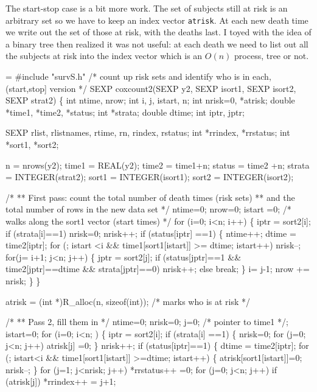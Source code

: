 \documentclass{article}
\begin{document}
The start-stop case is a bit more work.
The set of subjects still at risk is an arbitrary set so we have to 
keep an index vector \Verb!atrisk!.
At each new death time we write out the set of those at risk, with the
deaths last.
I toyed with the idea of a binary tree then realized it was not useful:
at each death we need to list out all the subjects at risk into the index
vector which is an $O(n)$ process, tree or not.
\begin{nwchunk}
=
 #include "survS.h"
 /* count up risk sets and identify who is in each, (start,stop] version */
 SEXP coxcount2(SEXP y2, SEXP isort1, SEXP isort2, SEXP strat2) \{
     int ntime, nrow;
     int i, j, istart, n;
     int nrisk=0, *atrisk;
     double *time1, *time2, *status;
     int *strata;
     double dtime;
     int iptr, jptr;
 
     SEXP rlist, rlistnames, rtime, rn, rindex, rstatus;
     int *rrindex, *rrstatus;
     int *sort1, *sort2;
     
     n = nrows(y2);
     time1 = REAL(y2);
     time2 =  time1+n;
     status = time2 +n;
     strata = INTEGER(strat2);
     sort1 = INTEGER(isort1);
     sort2 = INTEGER(isort2);
     
     /* 
     ** First pass: count the total number of death times (risk sets)
     **  and the total number of rows in the new data set
     */
     ntime=0; nrow=0;
     istart =0;  /* walks along the sort1 vector (start times) */
         for (i=0; i<n; i++) \{
         iptr = sort2[i];
         if (strata[i]==1) nrisk=0;
         nrisk++;
         if (status[iptr] ==1) \{
             ntime++;
             dtime = time2[iptr];
             for (; istart <i && time1[sort1[istart]] >= dtime; istart++) 
                          nrisk--;
             for(j= i+1; j<n; j++) \{
                 jptr = sort2[j];
                 if (status[jptr]==1 && time2[jptr]==dtime && strata[jptr]==0)
                     nrisk++;
                 else break;
                 \}
             i= j-1;
             nrow += nrisk;
             \}
         \}
 
     atrisk = (int *)R_alloc(n, sizeof(int)); /* marks who is at risk */
     
     /*
     ** Pass 2, fill them in
     */
     ntime=0; nrisk=0;
     j=0;  /* pointer to time1 */;
     istart=0;
     for (i=0; i<n; ) \{
         iptr = sort2[i];
         if (strata[i] ==1) \{
             nrisk=0;
             for (j=0; j<n; j++) atrisk[j] =0;
             \}
         nrisk++;
         if (status[iptr]==1) \{
             dtime = time2[iptr];
             for (; istart<i && time1[sort1[istart]] >=dtime; istart++) \{
                 atrisk[sort1[istart]]=0;
                 nrisk--;
                 \}
             for (j=1; j<nrisk; j++) *rrstatus++ =0;
             for (j=0; j<n; j++) if (atrisk[j]) *rrindex++ = j+1;
 

\end{nwchunk}
\end{document}
